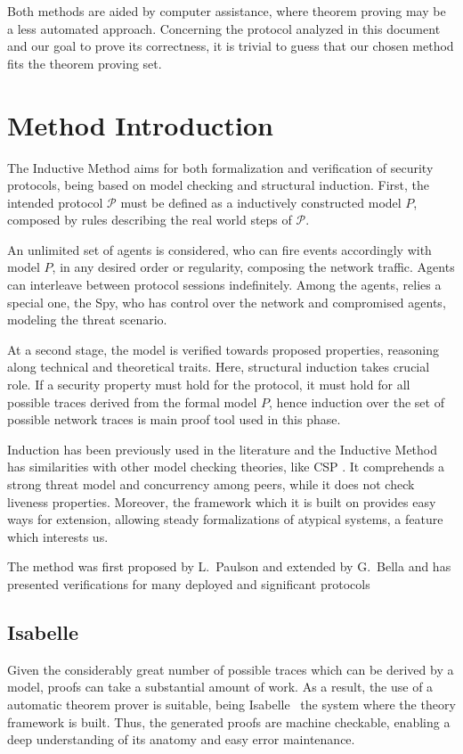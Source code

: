 Both methods are aided by computer assistance, where theorem proving may be a less automated approach. Concerning the protocol analyzed in this document and our goal to prove its correctness, it is trivial to guess that our chosen method fits the theorem proving set.





\section{Method Introduction}
The Inductive Method aims for both formalization and verification of security protocols, being based on model checking and structural induction. First, the intended protocol $\mathcal{P}$ must be defined as a inductively constructed model $P$, composed by rules describing the real world steps of $\mathcal{P}$.

An unlimited set of agents is considered, who can fire events accordingly with model $P$, in any desired order or regularity, composing the network traffic. Agents can interleave between protocol sessions indefinitely. Among the agents, relies a special one, the Spy, who has control over the network and compromised agents, modeling the threat scenario.

At a second stage, the model is verified towards proposed properties, reasoning along technical and theoretical traits. Here, structural induction takes crucial role. If a security property must hold for the protocol, it must hold for all possible traces derived from the formal model $P$, hence induction over the set of possible network traces is main proof tool used in this phase.

Induction has been previously used in the literature \cite{meadows} and the Inductive Method has similarities with other model checking theories, like CSP \cite{ryan-schneider}. It comprehends a strong threat model and concurrency among peers, while it does not check liveness properties. Moreover, the framework which it is built on provides easy ways for extension, allowing steady formalizations of atypical systems, a feature which interests us.

The method was first proposed by L.~Paulson \cite{paulson-inductive} and extended by G.~Bella \cite{bella-book} and has presented verifications for many deployed and significant protocols \cite{inductive-on-tls} %



\subsection{Isabelle}
Given the considerably great number of possible traces which can be derived by a model, proofs can take a substantial amount of work. As a result, the use of a automatic theorem prover is suitable, being Isabelle~\cite{isabelle} the system where the theory framework is built. Thus, the generated proofs are machine checkable, enabling a deep understanding of its anatomy and easy error maintenance.

